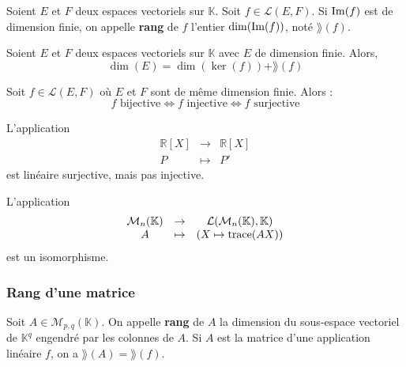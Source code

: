 
  \begin{definition}
    Soient $E$ et $F$ deux espaces vectoriels sur $\mathbb{K}$. Soit $f \in \mathcal{L}(E, F)$. Si $\mathrm{Im}(f)$ est de dimension finie, on appelle \textbf{rang} de $f$ l'entier $\dim(\mathrm{Im}(f))$, noté $\rang (f)$.
  \end{definition}

  \begin{theorem}
    Soient $E$ et $F$ deux espaces vectoriels sur $\mathbb{K}$ avec $E$ de dimension finie. Alors,
    \[ \dim(E) = \dim(\ker (f)) + \rang (f) \]
  \end{theorem}

  \begin{corollary}
    Soit $f \in \mathcal{L}(E, F)$ où $E$ et $F$ sont de même dimension finie. Alors :
    \[ f \text{ bijective} \iff f \text{ injective} \iff f \text{ surjective} \]
  \end{corollary}

  \begin{cexample}
    L'application
    \[
    \begin{array}{ccc}
      \mathbb{R}[X] &\rightarrow& \mathbb{R}[X] \\
      P &\mapsto& P'
    \end{array}
    \]
    est linéaire surjective, mais pas injective.
  \end{cexample}


  \begin{application}
    L'application
    \[
    \begin{array}{ccc}
      \mathcal{M}_n(\mathbb{K}) &\rightarrow& \mathcal{L}(\mathcal{M}_n(\mathbb{K}), \mathbb{K}) \\
      A &\mapsto& (X \mapsto \operatorname{trace}(AX))
    \end{array}
    \]
    est un isomorphisme.
  \end{application}

  \subsubsection{Rang d'une matrice}


  \begin{definition}
    Soit $A \in \mathcal{M}_{p,q}(\mathbb{K})$. On appelle \textbf{rang} de $A$ la dimension du sous-espace vectoriel de $\mathbb{K}^q$ engendré par les colonnes de $A$. Si $A$ est la matrice d'une application linéaire $f$, on a $\rang (A) = \rang (f)$.
  \end{definition}

